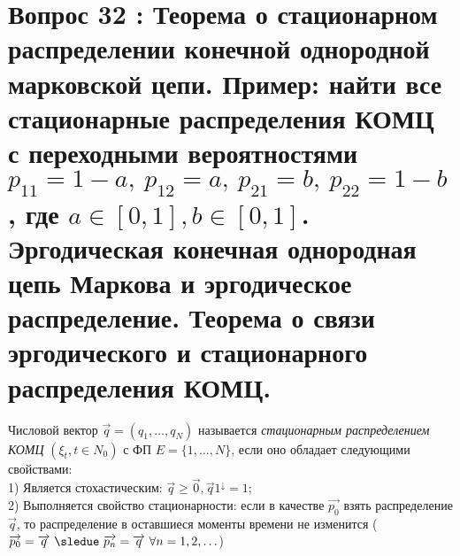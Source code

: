 \section{Вопрос 32 :
Теорема о стационарном распределении конечной однородной марковской цепи.
Пример: найти все стационарные распределения КОМЦ с переходными вероятностями
$p_{11} = 1 - a, \ p_{12} = a, \ p_{21} = b, \ p_{22} = 1 - b$, где $a \in [0,1], b \in [0,1]$.
Эргодическая конечная однородная цепь Маркова и эргодическое распределение.
Теорема о связи эргодического и стационарного распределения КОМЦ.
}

\begin{defs}
  Числовой вектор $\overrightarrow{q} = (q_1, \ldots, q_N)$ называется \textit{стационарным распределением КОМЦ}
  $(\xi_t, t \in N_0)$ с ФП $E = \{1, \ldots, N\}$, если оно обладает следующими свойствами:\\
  1) Является стохастическим: $\overrightarrow{q} \geqslant \overrightarrow{0}, \overrightarrow{q}1^\downarrow = 1$;\\
  2) Выполняется свойство стационарности: если в качестве $\overrightarrow{p_0}$ взять распределение $\overrightarrow{q}$, то распределение
  в оставшиеся моменты времени не изменится ($\overrightarrow{p_0} = \overrightarrow{q} \ \sledue \
  \overrightarrow{p_n} = \overrightarrow{q} \ \forall n = 1,2,\ldots$)
\end{defs}

